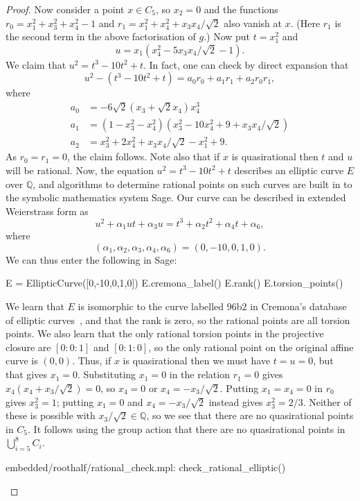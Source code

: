 \documentclass[reqno]{amsart}
\newcommand{\al}        {\alpha}
\newcommand{\Q}         {{\mathbb{Q}}}
\newcommand{\rt}        {\sqrt{2}}
\renewcommand{\:}{\colon}
\theoremstyle{definition}
\begin{document}
\begin{proof}
 Now consider a point $x\in C_5$, so $x_2=0$ and the functions
 $r_0=x_1^2+x_3^2+x_4^2-1$ and $r_1=x_1^2+x_4^2+x_3x_4/\rt$ also
 vanish at $x$.  (Here $r_1$ is the second term in the above
 factorisation of $g$.)  Now put $t=x_1^2$ and
 \[ u = x_1(x_4^2-5x_3x_4/\rt-1). \]
 We claim that $u^2=t^3-10t^2+t$.  In fact, one can check by direct
 expansion that
 \[ u^2 - (t^3-10t^2+t) = a_0r_0 + a_1r_1 + a_2r_0r_1, \]
 where
 \begin{align*}
  a_0 &= -6 \rt (x_3+\rt x_4) x_4^3 \\
  a_1 &= (1-x_3^2-x_4^2) (x_3^2-10 x_4^2+9+x_3 x_4/\rt) \\
  a_2 &= x_3^2+2 x_4^2+x_3 x_4/\rt-x_1^2+9.
 \end{align*}
 As $r_0=r_1=0$, the claim follows.  Note also that if $x$ is
 quasirational then $t$ and $u$ will be rational.  Now, the equation
 $u^2=t^3-10t^2+t$ describes an elliptic curve $E$ over $\Q$, and
 algorithms to determine rational points on such curves are built in
 to the symbolic mathematics system Sage.  Our curve can be
 described in extended Weierstrass form as
 \[ u^2 + \al_1ut + \al_3u = t^3 + \al_2t^2 + \al_4t + \al_6, \]
 where
 \[ (\al_1,\al_2,\al_3,\al_4,\al_6) = (0,-10,0,1,0). \]
 We can thus enter the following in Sage:
\begin{mcodeblock}
   E = EllipticCurve([0,-10,0,1,0])
   E.cremona_label()
   E.rank()
   E.torsion_points()
\end{mcodeblock}
 We learn that $E$ is isomorphic to the curve labelled 96b2 in
 Cremona's database of elliptic curves~\cite{cr:ecd}, and that the
 rank is zero, so the rational points are all torsion points.  We also
 learn that the only rational torsion points in the projective closure
 are $[0:0:1]$ and $[0:1:0]$, so the only rational point on the
 original affine curve is $(0,0)$.  Thus, if $x$ is quasirational then
 we must have $t=u=0$, but that gives $x_1=0$.  Substituting $x_1=0$
 in the relation $r_1=0$ gives $x_4(x_4+x_3/\rt)=0$, so $x_4=0$ or
 $x_4=-x_3/\rt$.  Putting $x_1=x_4=0$ in $r_0$ gives $x_3^2=1$;
 putting $x_1=0$ and $x_4=-x_3/\rt$ instead gives $x_3^2=2/3$.
 Neither of these is possible with $x_3/\rt\in\Q$, so we see that
 there are no quasirational points in $C_5$.  It follows using the
 group action that there are no quasirational points in
 $\bigcup_{i=5}^8C_i$.
 \begin{checks}
  embedded/roothalf/rational_check.mpl: check_rational_elliptic()
 \end{checks}
\end{proof}
\end{document}
